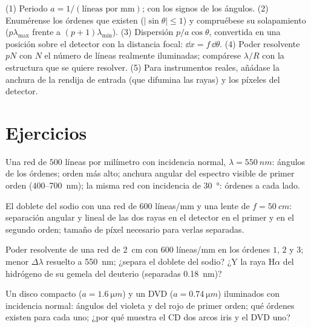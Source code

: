 \begin{method}\label{met:b2:gratings:method}
(1) Periodo $a = 1/(\text{líneas por mm})$;  con los
signos de los ángulos. (2) Enumérense los órdenes que existen ($|\sin\theta| \le 1$)
y compruébese su solapamiento ($p\lambda_{\max}$ frente a $(p + 1)\lambda_{\min}$). (3)
Dispersión $p/a\cos\theta$, convertida en una posición sobre el detector con
la distancia focal: $\dd x = f\,\dd\theta$. (4) Poder resolvente $pN$ con $N$ el número de
líneas realmente iluminadas; compárese $\lambda/R$ con la estructura que se quiere
resolver. (5) Para instrumentos reales, añádase la anchura de la rendija de entrada (que
difumina las rayas) y los píxeles del detector.
\end{method}

\section{Ejercicios}

\begin{exercise}[$\star$]\label{exo:b2:gratings:1}
Una red de $500$ líneas por milímetro con incidencia normal, $\lambda =
\qty{550}{nm}$: ángulos de los órdenes; orden más alto; anchura angular del
espectro visible de primer orden ($400$--\qty{700}{nm}); la misma red con
incidencia de \qty{30}{\degree}: órdenes a cada lado.
\end{exercise}

\begin{exercise}[$\star$]\label{exo:b2:gratings:2}
El doblete del sodio con una red de $600$ líneas/mm y una lente de $f =
\qty{50}{cm}$: separación angular y lineal de las dos rayas en el
detector en el primer y en el segundo orden; tamaño de píxel necesario para verlas
separadas.
\end{exercise}

\begin{exercise}[$\star$]\label{exo:b2:gratings:3}
Poder resolvente de una red de \qty{2}{cm} con $600$ líneas/mm en los órdenes $1$, $2$ y
$3$; menor $\Delta\lambda$ resuelto a \qty{550}{nm}; ¿separa el doblete del sodio?
¿Y la raya H$\alpha$ del hidrógeno de su gemela del deuterio (separadas \qty{0.18}{nm})?
\end{exercise}

\begin{exercise}[$\star$]\label{exo:b2:gratings:4}
Un disco compacto ($a = \qty{1.6}{\micro m}$) y un DVD ($a = \qty{0.74}{\micro m}$) iluminados con
incidencia normal: ángulos del violeta y del rojo de primer orden; qué órdenes
existen para cada uno; ¿por qué muestra el CD dos arcos iris y el DVD uno?
\end{exercise}

